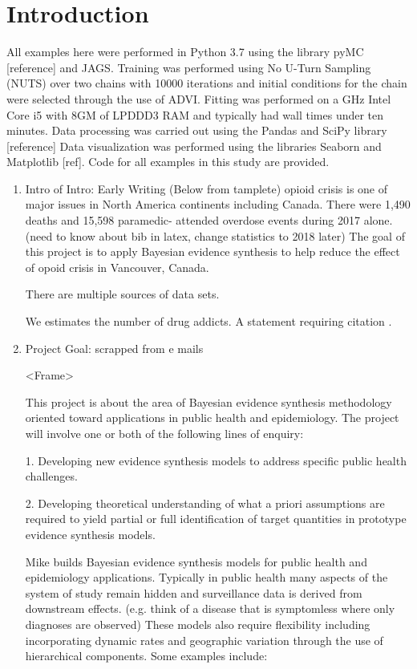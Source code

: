 \documentclass[
10pt, %
a4paper, %
oneside, %
headinclude,footinclude, %
BCOR5mm, %
]{scrartcl}
\begin{document}
\section{Introduction}
All examples here were performed in Python 3.7 using the library pyMC [reference] and JAGS. Training was performed using No U-Turn Sampling (NUTS) over two chains with 10000 iterations and initial conditions for the chain were selected through the use of ADVI. Fitting was performed on a GHz Intel Core i5 with 8GM of LPDDD3 RAM and typically had wall times under ten minutes. Data processing was carried out using the Pandas and SciPy library [reference] Data visualization was performed using the libraries Seaborn and Matplotlib [ref]. Code for all examples in this study are provided.
\begin{enumerate}
	\item{Intro of Intro: Early Writing}
	(Below from tamplete)
	opioid crisis is one of major issues in North America continents including Canada. There were 1,490 deaths and 15,598 paramedic- attended overdose events during 2017 alone. \cite{Irvine:modelling} (need to know about bib in latex, change statistics to 2018 later) The goal of this project is to apply Bayesian evidence synthesis to help reduce the effect of opoid crisis in Vancouver, Canada.
	
	There are multiple sources of data sets.   
	
	We estimates the number of drug addicts.  
	A statement requiring citation \cite{Figueredo:2009dg}.
	
	\item{Project Goal: scrapped from e mails}
	
	<Frame>
	
	This project is about the area of Bayesian evidence synthesis methodology oriented toward applications in public health and epidemiology.  The project will involve one or both of the following lines of enquiry:
	
	1. Developing new evidence synthesis models to address specific public health challenges.
	
	2. Developing theoretical understanding of what a priori assumptions are required to yield partial or full identification of target quantities in prototype evidence synthesis models.
	
	Mike builds Bayesian evidence synthesis models for public health and epidemiology applications. Typically in public health many aspects of the system of study remain hidden and surveillance data is derived from downstream effects. (e.g. think of a disease that is symptomless where only diagnoses are observed) These models also require flexibility including incorporating dynamic rates and geographic variation through the use of hierarchical components. Some examples include:
	

\end{enumerate}
\end{document}
